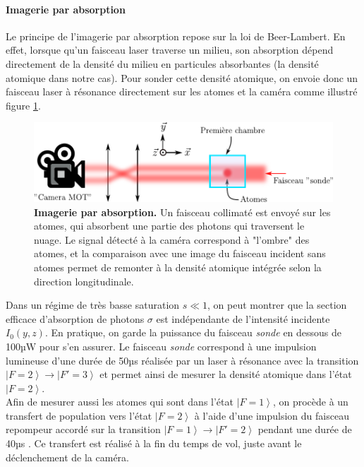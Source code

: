 \paragraph*{Imagerie par absorption}
Le principe de l'imagerie par absorption repose sur la loi de Beer-Lambert. En effet, lorsque qu'un faisceau laser traverse un milieu, son absorption dépend directement de la densité du milieu en particules absorbantes (la densité atomique dans notre cas). Pour sonder cette densité atomique, on envoie donc un faisceau laser à résonance directement sur les atomes et la caméra comme illustré figure \ref{fig:img_mot}. 
\begin{figure}
\centering
\includegraphics[width=\textwidth]{fig/BEC_manip/img_mot.pdf}
\caption{\textbf{Imagerie par absorption.} Un faisceau collimaté est envoyé sur les atomes, qui absorbent une partie des photons qui traversent le nuage. Le signal détecté à la caméra correspond à "l'ombre" des atomes, et la comparaison avec une image du faisceau incident sans atomes permet de remonter à la densité atomique intégrée selon la direction longitudinale.}
\label{fig:img_mot}
\end{figure}
Dans un régime de très basse saturation $s \ll 1$, on peut montrer que la section efficace d'absorption de photons $\sigma$ est indépendante de l'intensité incidente $I_0(y,z)$. En pratique, on garde la puissance du faisceau \emph{sonde} en dessous de 100µW pour s'en assurer. Le faisceau \emph{sonde} correspond à une impulsion lumineuse d'une durée de 50µs réalisée par un laser à résonance avec la transition $\left| F=2 \right\rangle \rightarrow \left| F'=3 \right\rangle$ et permet ainsi de mesurer la densité atomique dans l'état $\left| F=2 \right\rangle$. \\
Afin de mesurer aussi les atomes qui sont dans l'état $\left| F=1 \right\rangle$, on procède à un transfert de population vers l'état $\left| F=2 \right\rangle$ à l'aide d'une impulsion du faisceau repompeur accordé sur la transition $\left| F=1 \right\rangle \rightarrow \left| F'=2 \right\rangle$ pendant une durée de 40µs . Ce transfert est réalisé à la fin du temps de vol, juste avant le déclenchement de la caméra. \\

